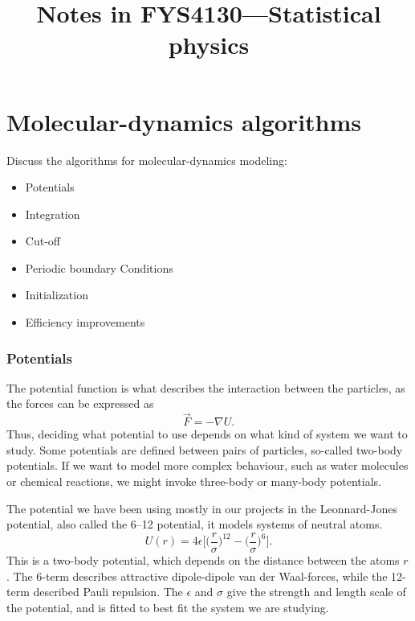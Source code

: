 \documentclass[a4paper, 11pt, notitlepage, english]{article}
\author{}
\title{Notes in FYS4130---Statistical physics}
\renewcommand{\b}{\bigg}
\newcommand{\eps}{\epsilon}
\begin{document}
\tableofcontents
\clearpage





\section{Molecular-dynamics algorithms}
Discuss the algorithms for molecular-dynamics modeling:
\begin{itemize}
	\item Potentials
	\item Integration
	\item Cut-off
	\item Periodic boundary Conditions
	\item Initialization
	\item Efficiency improvements
\end{itemize}

\subsubsection*{Potentials}

The potential function is what describes the interaction between the particles, as the forces can be expressed as
$$\vec{F} = -\nabla U.$$
Thus, deciding what potential to use depends on what kind of system we want to study. Some potentials are defined between pairs of particles, so-called two-body potentials. If we want to model more complex behaviour, such as water molecules or chemical reactions, we might invoke three-body or many-body potentials.

The potential we have been using mostly in our projects in the Leonnard-Jones potential, also called the 6--12 potential, it models systems of neutral atoms.
$$U(r) = 4\eps \bigg[\b(\frac{r}{\sigma}\b)^{12} - \b(\frac{r}{\sigma}\b)^6\bigg].$$
This is a two-body potential, which depends on the distance between the atoms $r$. The 6-term describes attractive dipole-dipole van der Waal-forces, while the 12-term described Pauli repulsion. The $\eps$ and $\sigma$ give the strength and length scale of the potential, and is fitted to best fit the system we are studying.
\end{document}
